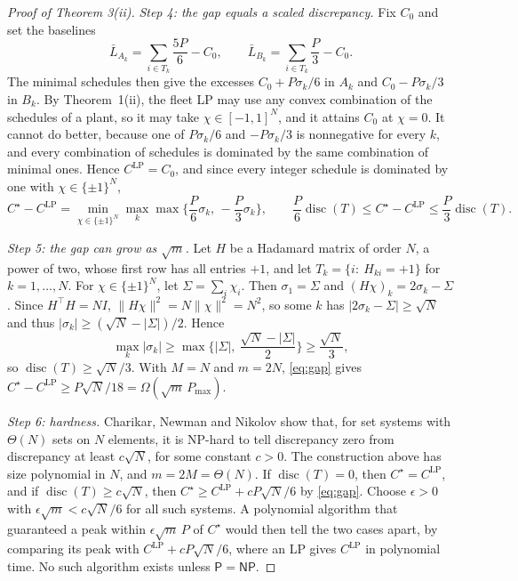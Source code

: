 \documentclass[11pt]{article}
\newcommand{\Cs}{C^{\star}}
\newcommand{\CLP}{C^{\mathrm{LP}}}
\newcommand{\disc}{\operatorname{disc}}
\begin{document}
\begin{proof}[Proof of Theorem 3(ii)]
\emph{Step 4: the gap equals a scaled discrepancy.} Fix $C_0$ and set the baselines
\[
\bar L_{A_k}=\sum_{i\in T_k}\frac{5P}{6}-C_0,\qquad \bar L_{B_k}=\sum_{i\in T_k}\frac{P}{3}-C_0.
\]
The minimal schedules then give the excesses $C_0+P\sigma_k/6$ in $A_k$ and $C_0-P\sigma_k/3$ in $B_k$. By
Theorem~1(ii), the fleet LP may use any convex combination of the schedules of a plant, so it may take
$\chi\in[-1,1]^N$, and it attains $C_0$ at $\chi=0$. It cannot do better, because one of $P\sigma_k/6$ and $-P\sigma_k/3$
is nonnegative for every $k$, and every combination of schedules is dominated by the same combination of minimal ones.
Hence $\CLP=C_0$, and since every integer schedule is dominated by one with $\chi\in\{\pm1\}^N$,
\begin{equation}\label{eq:gap}
\Cs-\CLP=\min_{\chi\in\{\pm1\}^N}\max_k\max\Big\{\frac P6\sigma_k,\,-\frac P3\sigma_k\Big\},\qquad
\frac P6\disc(T)\le\Cs-\CLP\le\frac P3\disc(T).
\end{equation}

\emph{Step 5: the gap can grow as $\sqrt m$.} Let $H$ be a Hadamard matrix of order $N$, a power of two, whose first row
has all entries $+1$, and let $T_k=\{i:\ H_{ki}=+1\}$ for $k=1,\dots,N$. For $\chi\in\{\pm1\}^N$, let $\Sigma=\sum_i\chi_i$.
Then $\sigma_1=\Sigma$ and $(H\chi)_k=2\sigma_k-\Sigma$. Since $H^\top H=NI$,
$\|H\chi\|^2=N\|\chi\|^2=N^2$, so some $k$ has $|2\sigma_k-\Sigma|\ge\sqrt N$ and thus $|\sigma_k|\ge(\sqrt
N-|\Sigma|)/2$. Hence
\[
\max_k|\sigma_k|\ge\max\Big\{|\Sigma|,\ \frac{\sqrt N-|\Sigma|}{2}\Big\}\ge\frac{\sqrt N}{3},
\]
so $\disc(T)\ge\sqrt N/3$. With $M=N$ and $m=2N$, \eqref{eq:gap} gives $\Cs-\CLP\ge P\sqrt N/18=\Omega(\sqrt
m\,P_{\max})$.

\emph{Step 6: hardness.} Charikar, Newman and Nikolov \cite{charikar2011soda} show that, for set systems with
$\Theta(N)$ sets on $N$ elements, it is NP-hard to tell discrepancy zero from discrepancy at least $c\sqrt N$, for some
constant $c>0$. The construction above has size polynomial in $N$, and $m=2M=\Theta(N)$. If $\disc(T)=0$, then
$\Cs=\CLP$, and if $\disc(T)\ge c\sqrt N$, then $\Cs\ge\CLP+cP\sqrt N/6$ by \eqref{eq:gap}. Choose $\epsilon>0$ with
$\epsilon\sqrt m<c\sqrt N/6$ for all such systems. A polynomial algorithm that guaranteed a peak within $\epsilon\sqrt
m\,P$ of $\Cs$ would then tell the two cases apart, by comparing its peak with $\CLP+cP\sqrt N/6$, where an LP gives $\CLP$
in polynomial time. No such algorithm exists unless $\mathsf P=\mathsf{NP}$.
\end{proof}
\end{document}
